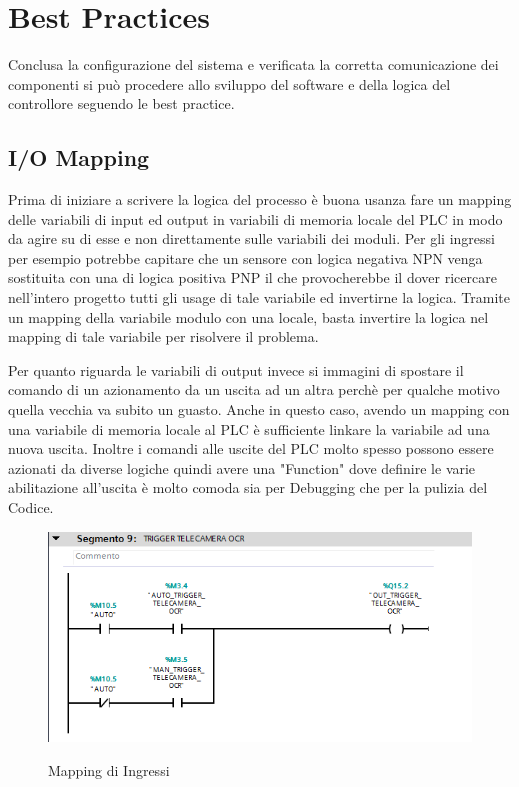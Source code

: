 \documentclass[12pt, a4paper, oneside]{book}
\begin{document}
\section{Best Practices}
Conclusa la configurazione del sistema e verificata la corretta comunicazione dei componenti si può procedere allo sviluppo del software e della logica del controllore seguendo le best practice.

\subsection{I/O Mapping}Prima di iniziare a scrivere la logica del processo è buona usanza fare un mapping delle variabili di input ed output in variabili di memoria locale del PLC in modo da agire su di esse e non direttamente sulle variabili dei moduli. Per gli ingressi per esempio potrebbe capitare che un sensore con logica negativa NPN venga sostituita con una di logica positiva PNP il che provocherebbe il dover ricercare nell'intero progetto tutti gli usage di tale variabile ed invertirne la logica. Tramite un mapping della variabile modulo con una locale, basta invertire la logica nel mapping di tale variabile per risolvere il problema.

Per quanto riguarda le variabili di output invece si immagini di spostare il comando di un azionamento da un uscita ad un altra perchè per qualche motivo quella vecchia va subito un guasto. Anche in questo caso, avendo un mapping con una variabile di memoria locale al PLC è sufficiente linkare la variabile ad una nuova uscita.
Inoltre i comandi alle uscite del PLC molto spesso possono essere azionati da diverse logiche quindi avere una "Function" dove definire le varie abilitazione all'uscita è molto comoda sia per Debugging che per la pulizia del Codice.



	\begin{figure}[H]
	\centering
	\includegraphics[width=12cm]{Immagini/OUT}
	\label{IN}
	\caption{Mapping di Ingressi}
\end{figure}
\end{document}
